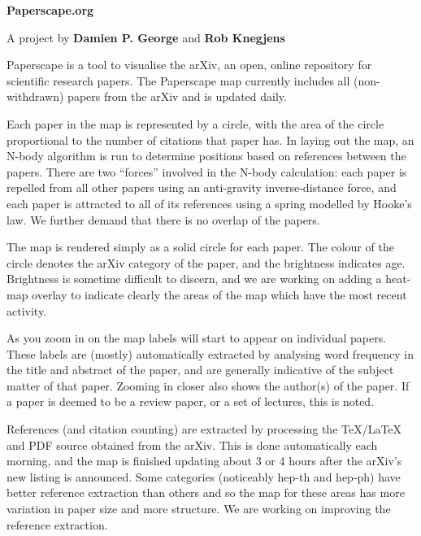 \documentclass[11pt]{article}
\begin{document}
{\Huge\bf Paperscape.org}

{\large A project by {\bf Damien P. George} and {\bf Rob Knegjens}}

Paperscape is a tool to visualise the arXiv, an open, online repository for scientific research papers. The Paperscape map currently includes all (non-withdrawn) papers from the arXiv and is updated daily.

Each paper in the map is represented by a circle, with the area of the circle proportional to the number of citations that paper has. In laying out the map, an N-body algorithm is run to determine positions based on references between the papers. There are two “forces” involved in the N-body calculation: each paper is repelled from all other papers using an anti-gravity inverse-distance force, and each paper is attracted to all of its references using a spring modelled by Hooke’s law. We further demand that there is no overlap of the papers.

The map is rendered simply as a solid circle for each paper. The colour of the circle denotes the arXiv category of the paper, and the brightness indicates age. Brightness is sometime difficult to discern, and we are working on adding a heat-map overlay to indicate clearly the areas of the map which have the most recent activity.

As you zoom in on the map labels will start to appear on individual papers. These labels are (mostly) automatically extracted by analysing word frequency in the title and abstract of the paper, and are generally indicative of the subject matter of that paper. Zooming in closer also shows the author(s) of the paper. If a paper is deemed to be a review paper, or a set of lectures, this is noted.

References (and citation counting) are extracted by processing the TeX/LaTeX and PDF source obtained from the arXiv. This is done automatically each morning, and the map is finished updating about 3 or 4 hours after the arXiv’s new listing is announced. Some categories (noticeably hep-th and hep-ph) have better reference extraction than others and so the map for these areas has more variation in paper size and more structure. We are working on improving the reference extraction.
\end{document}
